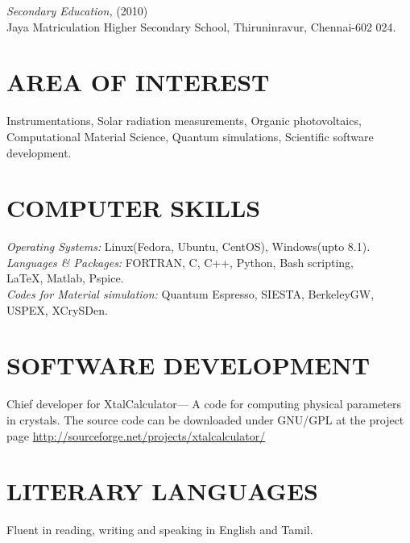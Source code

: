\documentclass[line,margin,12pt ]{res}
\begin{document}
\begin{resume}
{\sl Secondary Education,} \hfill (2010)\\
                Jaya Matriculation Higher Secondary School, Thiruninravur, Chennai-602 024.
 


\section{AREA OF INTEREST}
Instrumentations, Solar radiation measurements, Organic photovoltaics,\\ Computational Material Science, Quantum simulations, Scientific software \\development.


\section{COMPUTER SKILLS}
{\sl Operating Systems:} Linux(Fedora, Ubuntu, CentOS), Windows(upto 8.1).\\
{\sl Languages \& Packages:} FORTRAN, C, C++, Python, Bash scripting, \\\LaTeX, Matlab, Pspice.\\
{\sl Codes for Material simulation:} Quantum Espresso, SIESTA, BerkeleyGW,\\ USPEX, XCrySDen.


\section{SOFTWARE DEVELOPMENT}
Chief developer for  \textgravedbl XtalCalculator\textacutedbl --- A code for computing physical parameters in crystals. The source code can be downloaded under GNU/GPL at the project page \url{http://sourceforge.net/projects/xtalcalculator/}


\section{LITERARY LANGUAGES} 
Fluent in reading, writing and speaking in English and Tamil.\\


\end{resume}
\end{document}
